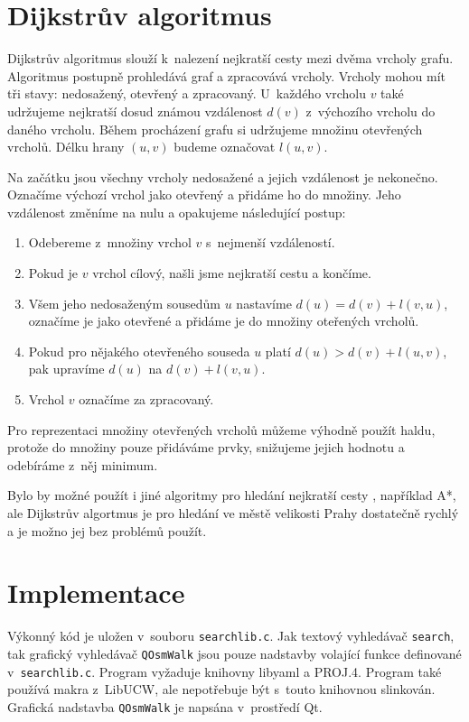\section{Dijkstrův algoritmus}
Dijkstrův algoritmus \cite{dijkstra} slouží k~nalezení nejkratší cesty mezi dvěma vrcholy grafu.
Algoritmus postupně prohledává graf a zpracovává vrcholy. Vrcholy mohou mít tři
stavy: nedosažený, otevřený a zpracovaný. U~každého vrcholu $v$ také udržujeme
nejkratší dosud známou vzdálenost $d(v)$ z~výchozího vrcholu do daného vrcholu. 
Během procházení grafu si udržujeme množinu otevřených vrcholů. Délku hrany
$(u,v)$ budeme označovat $l(u,v)$.

Na začátku jsou všechny vrcholy nedosažené a jejich vzdálenost je nekonečno.
Označíme výchozí vrchol jako otevřený a přidáme ho do množiny. Jeho vzdálenost
změníme na nulu a opakujeme následující postup:
\begin{enumerate}
	\item Odebereme z~množiny vrchol $v$ s~nejmenší vzdáleností. 
	\item Pokud je $v$ vrchol cílový, našli jsme nejkratší cestu a končíme.
	\item Všem jeho nedosaženým sousedům $u$ nastavíme $d(u)=d(v)+l(v,u)$,
	označíme je jako otevřené a přidáme je do množiny oteřených vrcholů.
	\item Pokud pro nějakého otevřeného souseda $u$ platí $d(u) >
	d(v)+l(u,v)$, pak upravíme $d(u)$ na $d(v)+l(v,u)$.
	\item Vrchol $v$ označíme za zpracovaný.
\end{enumerate}
Pro reprezentaci množiny otevřených vrcholů můžeme výhodně použít haldu, protože
do množiny pouze přidáváme prvky, snižujeme jejich hodnotu a odebíráme z~něj
minimum.

Bylo by možné použít i jiné algoritmy pro hledání nejkratší cesty
\cite{dijkstra}, například A*,  ale Dijkstrův
algortmus je pro hledání ve městě velikosti Prahy dostatečně rychlý a je možno
jej bez problémů použít.


\section{Implementace}
Výkonný kód je uložen v~souboru \verb|searchlib.c|. Jak textový vyhledávač
\verb|search|, tak grafický vyhledávač \verb|QOsmWalk| jsou pouze nadstavby
volající funkce definované v~\verb|searchlib.c|. Program vyžaduje knihovny {\tuc libyaml} a
{\tuc PROJ.4}. Program také používá makra z~{\tuc LibUCW}, ale nepotřebuje být s~touto
knihovnou slinkován. Grafická nadstavba \verb|QOsmWalk| je napsána v~prostředí
Qt.

